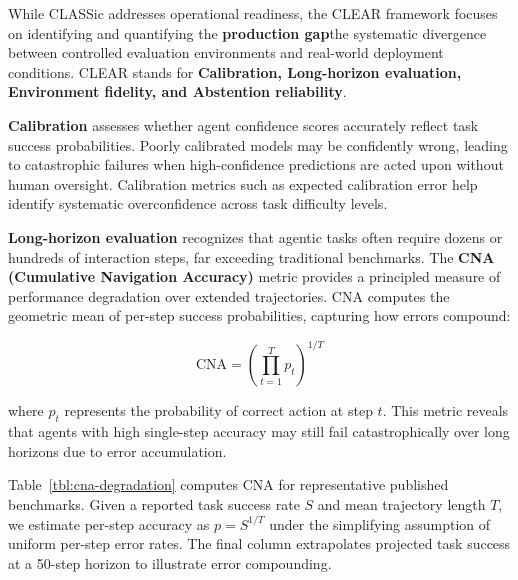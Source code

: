 While CLASSic addresses operational readiness, the CLEAR framework focuses on identifying and quantifying the \textbf{production gap}the systematic divergence between controlled evaluation environments and real-world deployment conditions. CLEAR stands for \textbf{Calibration, Long-horizon evaluation, Environment fidelity, and Abstention reliability}.

\textbf{Calibration} assesses whether agent confidence scores accurately reflect task success probabilities. Poorly calibrated models may be confidently wrong, leading to catastrophic failures when high-confidence predictions are acted upon without human oversight. Calibration metrics such as expected calibration error help identify systematic overconfidence across task difficulty levels.

\textbf{Long-horizon evaluation} recognizes that agentic tasks often require dozens or hundreds of interaction steps, far exceeding traditional benchmarks. The \textbf{CNA (Cumulative Navigation Accuracy)} metric provides a principled measure of performance degradation over extended trajectories. CNA computes the geometric mean of per-step success probabilities, capturing how errors compound:

$$
\text{CNA} = \left(\prod_{t=1}^{T} p_t\right)^{1/T}
$$

where $p_t$ represents the probability of correct action at step $t$. This metric reveals that agents with high single-step accuracy may still fail catastrophically over long horizons due to error accumulation.

Table~\ref{tbl:cna-degradation} computes CNA for representative published benchmarks. Given a reported task success rate $S$ and mean trajectory length $T$, we estimate per-step accuracy as $p = S^{1/T}$ under the simplifying assumption of uniform per-step error rates. The final column extrapolates projected task success at a 50-step horizon to illustrate error compounding.

